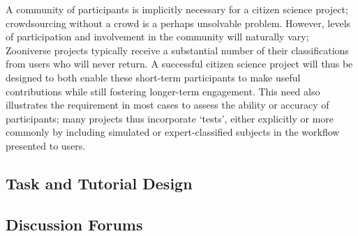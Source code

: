 \documentclass{sigchi}
\begin{document}

A community of participants is implicitly necessary for a citizen science project; crowdsourcing without a crowd is a perhaps unsolvable problem. However, levels of participation and involvement in the community will naturally vary; Zooniverse projects typically receive a substantial number of their classifications from users who will never return. A successful citizen science project will thus be designed to both enable these short-term participants to make useful contributions while still fostering longer-term engagement. This need also illustrates the requirement in most cases to assess the ability or accuracy of participants; many projects thus incorporate `tests', either explicitly or more commonly by including simulated or expert-classified subjects in the workflow presented to users. 


\subsection{Task and Tutorial Design}

\subsection{Discussion Forums}



\end{document}
